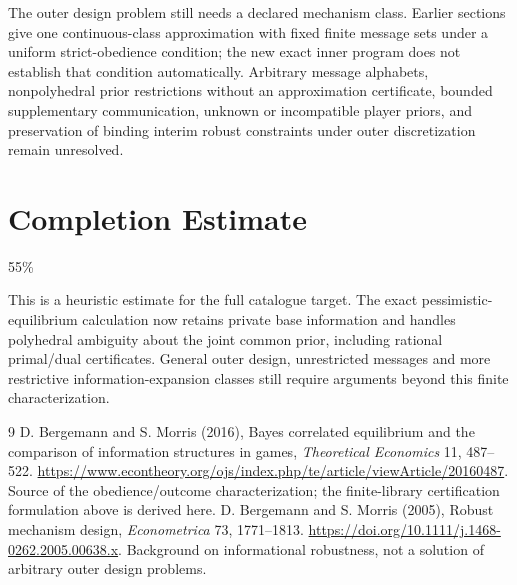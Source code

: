 \documentclass[11pt]{article}
\theoremstyle{definition}
\theoremstyle{remark}
\begin{document}
The outer design problem still needs a declared mechanism class.
Earlier sections give one continuous-class approximation with fixed
finite message sets under a uniform strict-obedience condition; the
new exact inner program does not establish that condition automatically.
Arbitrary message alphabets, nonpolyhedral prior restrictions without
an approximation certificate, bounded supplementary communication,
unknown or incompatible player priors, and preservation of binding
interim robust constraints under outer discretization remain unresolved.

\section{Completion Estimate}
55\%

This is a heuristic estimate for the full catalogue target.
The exact pessimistic-equilibrium calculation now retains private base
information and handles polyhedral ambiguity about the joint common
prior, including rational primal/dual certificates. General outer design,
unrestricted messages and more restrictive information-expansion classes
still require arguments beyond this finite characterization.

\begin{thebibliography}{9}
 D. Bergemann and S. Morris (2016), Bayes correlated equilibrium and the comparison of information structures in games, \emph{Theoretical Economics} 11, 487--522. \url{https://www.econtheory.org/ojs/index.php/te/article/viewArticle/20160487}. Source of the obedience/outcome characterization; the finite-library certification formulation above is derived here.
 D. Bergemann and S. Morris (2005), Robust mechanism design, \emph{Econometrica} 73, 1771--1813. \url{https://doi.org/10.1111/j.1468-0262.2005.00638.x}. Background on informational robustness, not a solution of arbitrary outer design problems.
\end{thebibliography}
\end{document}
